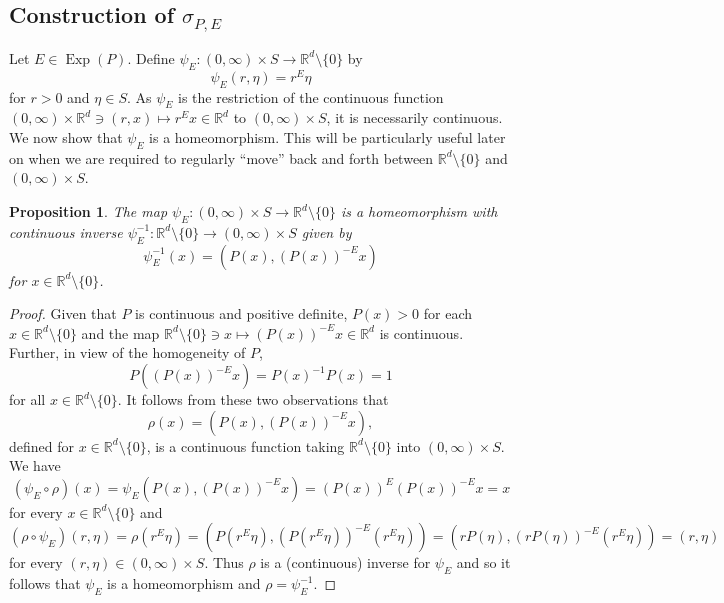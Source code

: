 \documentclass[11pt, letter]{book}
\newtheorem{proposition}[theorem]{Proposition}
\newcommand\Exp{\operatorname{Exp}}
\begin{document}
\subsection{Construction of $\sigma_{P,E}$}\label{subsec:ConstructionofSigma}

Let $E\in\Exp(P)$. Define $\psi_E:(0,\infty)\times S\to\mathbb{R}^d\setminus\{0\}$ by
\begin{equation}\label{eq:Homeomorphism}
\psi_E(r,\eta)=r^E\eta
\end{equation}
for $r>0$ and $\eta\in S$. As $\psi_E$ is the restriction of the continuous function $(0,\infty)\times \mathbb{R}^d\ni (r,x)\mapsto r^E x\in\mathbb{R}^d$ to $(0,\infty)\times S$, it is necessarily continuous. We now show that $\psi_E$ is a homeomorphism. This will be particularly useful later on when we are required to regularly ``move'' back and forth between $\mathbb{R}^d\setminus \{ 0\}$ and $(0,\infty)\times S$. 

\begin{framed}
\begin{proposition}\label{prop:PsiHomeomorphism}
The map $\psi_E:(0,\infty)\times S\to\mathbb{R}^d\setminus\{0\}$ is a homeomorphism with continuous inverse $\psi_E^{-1}:\mathbb{R}^d\setminus\{0\}\to (0,\infty)\times S$ given by
\begin{equation*}
\psi_E^{-1}(x)=(P(x),(P(x))^{-E}x)
\end{equation*}
for $x\in\mathbb{R}^d\setminus\{0\}$.
\end{proposition}
\end{framed}
\begin{proof}
Given that $P$ is continuous and positive definite, $P(x)>0$ for each $x\in \mathbb{R}^d\setminus\{0\}$ and the map $\mathbb{R}^d\setminus\{0\}\ni x \mapsto (P(x))^{-E}x\in \mathbb{R}^d$ is continuous. Further, in view of the homogeneity of $P$,
\begin{equation*}
P\left((P(x))^{-E} x \right)=P(x)^{-1}P(x)=1
\end{equation*}
for all $x\in\mathbb{R}^d\setminus\{0\}$. It follows from these two observations that
\begin{equation*}
\rho(x)=(P(x),(P(x))^{-E}x),
\end{equation*}
defined for $x\in\mathbb{R}^d\setminus\{0\}$, is a continuous function taking $\mathbb{R}^d\setminus\{0\}$ into $(0,\infty)\times S$. We have
\begin{equation*}
(\psi_E\circ \rho)(x)=\psi_E(P(x),(P(x))^{-E}x)=(P(x))^{E}(P(x))^{-E}x=x
\end{equation*}
for every $x\in \mathbb{R}^d\setminus \{0\}$ and
\begin{equation*}
(\rho\circ\psi_E)(r,\eta)=\rho(r^E\eta)=(P(r^{E}\eta),(P(r^{E}\eta))^{-E}(r^E\eta))=(rP(\eta),(rP(\eta))^{-E}(r^{E}\eta))=(r,\eta)
\end{equation*}
for every $(r,\eta)\in (0,\infty)\times S$. Thus $\rho$ is a (continuous) inverse for $\psi_E$ and so it follows that $\psi_E$ is a homeomorphism and $\rho=\psi_E^{-1}$.
\end{proof}
\end{document}
